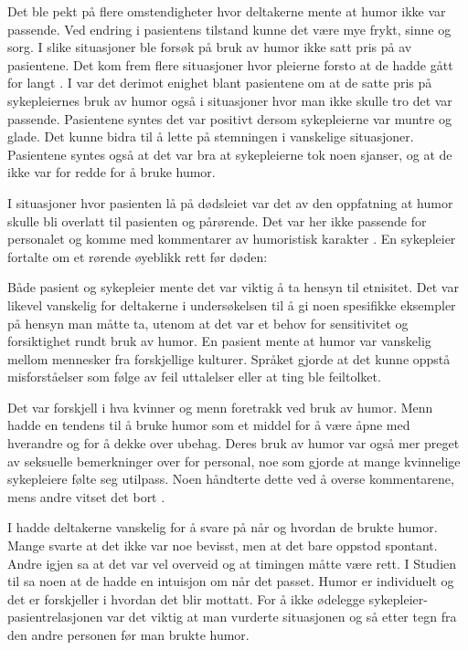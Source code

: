 Det ble pekt på flere omstendigheter hvor deltakerne mente at humor ikke var
passende. Ved endring i pasientens tilstand kunne det være mye frykt, sinne og
sorg. I slike situasjoner ble forsøk på bruk av humor ikke satt pris på av
pasientene. Det kom frem flere situasjoner hvor pleierne forsto at de hadde
gått for langt \cite{dean2005}. I  var det derimot
enighet blant pasientene om at de satte pris på sykepleiernes bruk av humor
også i situasjoner hvor man ikke skulle tro det var passende. Pasientene syntes
det var positivt dersom sykepleierne var muntre og glade. Det kunne bidra til å
lette på stemningen i vanskelige situasjoner. Pasientene syntes også at det var
bra at sykepleierne tok noen sjanser, og at de ikke var for redde for å bruke
humor.

I situasjoner hvor pasienten lå på dødsleiet var det av den oppfatning at humor
skulle bli overlatt til pasienten og pårørende. Det var her ikke passende for
personalet og komme med kommentarer av humoristisk karakter \cite{dean2005}.
En sykepleier fortalte om et rørende øyeblikk rett før døden:

Både pasient og sykepleier mente det var viktig å ta hensyn til etnisitet. Det
var likevel vanskelig for deltakerne i undersøkelsen til  å gi
noen spesifikke eksempler på hensyn man måtte ta, utenom at det var et behov
for sensitivitet og forsiktighet rundt bruk av humor. En pasient mente at humor
var vanskelig mellom mennesker fra forskjellige kulturer. Språket gjorde at det
kunne oppstå misforståelser som følge av feil uttalelser eller at ting ble
feiltolket.

Det var forskjell i hva kvinner og menn foretrakk ved bruk av humor. Menn hadde
en tendens til å bruke humor som et middel for å være åpne med hverandre og for
å dekke over ubehag. Deres bruk av humor var også mer preget av seksuelle
bemerkninger over for personal, noe som gjorde at mange kvinnelige sykepleiere
følte seg utilpass. Noen håndterte dette ved å overse kommentarene, mens andre
vitset det bort \cite{dean2005}.

I  hadde deltakerne vanskelig for å svare på når og hvordan de
brukte humor. Mange svarte at det ikke var noe bevisst, men at det bare oppstod
spontant. Andre igjen sa at det var vel overveid og at timingen måtte være
rett. I Studien til  sa noen at de hadde en intuisjon om når
det passet. Humor er individuelt og det er forskjeller i hvordan det blir
mottatt. For å ikke ødelegge sykepleier-pasientrelasjonen var det viktig at man
vurderte situasjonen og så etter tegn fra den andre personen før man brukte
humor.


